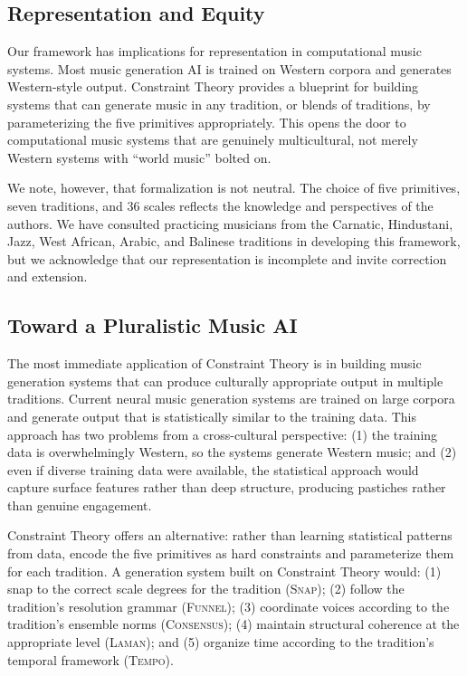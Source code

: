 \documentclass[cmj]{article}
\newcommand{\SNAP}{\textsc{Snap}}
\newcommand{\FUNNEL}{\textsc{Funnel}}
\newcommand{\CONSENSUS}{\textsc{Consensus}}
\newcommand{\LAMAN}{\textsc{Laman}}
\newcommand{\TEMPO}{\textsc{Tempo}}
\begin{document}
\subsection{Representation and Equity}

Our framework has implications for representation in computational music
systems. Most music generation AI is trained on Western corpora and generates
Western-style output. Constraint Theory provides a blueprint for building
systems that can generate music in any tradition, or blends of traditions,
by parameterizing the five primitives appropriately. This opens the door to
computational music systems that are genuinely multicultural, not merely
Western systems with ``world music'' bolted on.

We note, however, that formalization is not neutral. The choice of five
primitives, seven traditions, and 36 scales reflects the knowledge and
perspectives of the authors. We have consulted practicing musicians from the
Carnatic, Hindustani, Jazz, West African, Arabic, and Balinese traditions in
developing this framework, but we acknowledge that our representation is
incomplete and invite correction and extension.

\subsection{Toward a Pluralistic Music AI}

The most immediate application of Constraint Theory is in building music
generation systems that can produce culturally appropriate output in multiple
traditions. Current neural music generation systems \citep{dhariwal2020jukebox,
roberts2018hierarchical} are trained on large corpora and generate output that
is statistically similar to the training data. This approach has two problems
from a cross-cultural perspective: (1) the training data is overwhelmingly
Western, so the systems generate Western music; and (2) even if diverse
training data were available, the statistical approach would capture surface
features rather than deep structure, producing pastiches rather than genuine
engagement.

Constraint Theory offers an alternative: rather than learning statistical
patterns from data, encode the five primitives as hard constraints and
parameterize them for each tradition. A generation system built on Constraint
Theory would: (1) snap to the correct scale degrees for the tradition (\SNAP);
(2) follow the tradition's resolution grammar (\FUNNEL); (3) coordinate
voices according to the tradition's ensemble norms (\CONSENSUS); (4) maintain
structural coherence at the appropriate level (\LAMAN); and (5) organize time
according to the tradition's temporal framework (\TEMPO).
\end{document}
